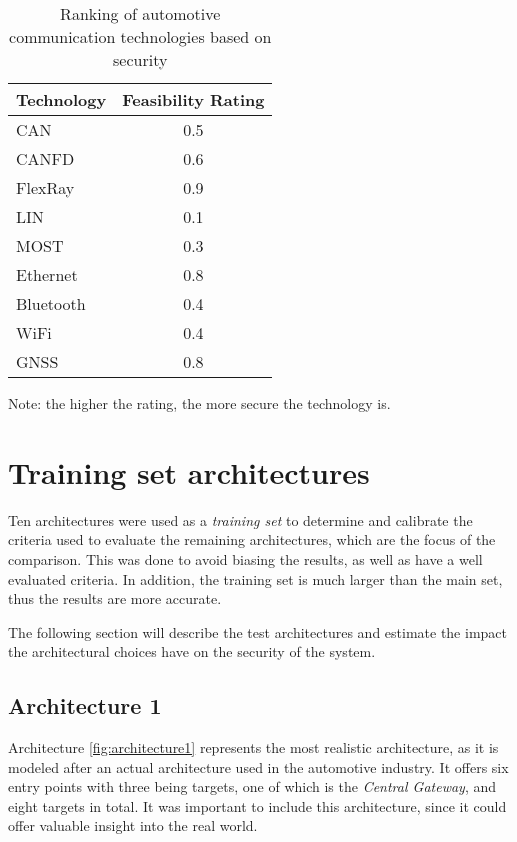 \begin{table}[h]
    \label{table:bus_rating}
    \centering
    \begin{tabular}{|l|c|}
    \hline
    \textbf{Technology} & \textbf{Feasibility Rating} \\
    \hline
    CAN & 0.5 \\
    CANFD & 0.6 \\
    FlexRay & 0.9 \\
    LIN & 0.1 \\
    MOST & 0.3 \\
    Ethernet & 0.8 \\
    Bluetooth & 0.4 \\
    WiFi & 0.4 \\
    GNSS & 0.8 \\
    \hline
    \end{tabular}
    \caption{Ranking of automotive communication technologies based on security}
\end{table}

Note: the higher the rating, the more secure the technology is.

\section{Training set architectures}
\label{sec:trainingarch}

Ten architectures were used as a \textit{training set} to determine and calibrate the criteria used to 
evaluate the remaining architectures, which are the focus of the comparison.
This was done to avoid biasing the results, as well as have a well evaluated criteria.
In addition, the training set is much larger than the main set, thus the results are more accurate.

The following section will describe the test architectures and estimate the impact the architectural choices have on the security of the system.

\subsection{Architecture 1}
\label{subsec:arch1}

Architecture \ref{fig:architecture1} represents the most realistic architecture, 
as it is modeled after an actual architecture used in the automotive industry. 
It offers six entry points with three being targets, one of which is the \textit{Central Gateway}, and eight targets in total. 
It was important to include this architecture, since it could offer valuable insight into the real world.

